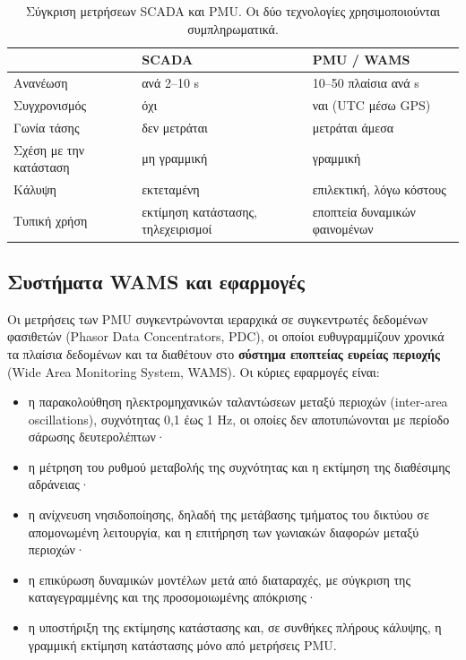 \begin{table}[!htbp]
\centering
\begin{tabular}{lll}
\hline
 & SCADA & PMU / WAMS \\
\hline
Ανανέωση         & ανά 2--10 s        & 10--50 πλαίσια ανά s \\
Συγχρονισμός     & όχι                & ναι (UTC μέσω GPS) \\
Γωνία τάσης      & δεν μετράται       & μετράται άμεσα \\
Σχέση με την κατάσταση & μη γραμμική & γραμμική \\
Κάλυψη           & εκτεταμένη         & επιλεκτική, λόγω κόστους \\
Τυπική χρήση     & εκτίμηση κατάστασης, τηλεχειρισμοί & εποπτεία δυναμικών φαινομένων \\
\hline
\end{tabular}
\caption{Σύγκριση μετρήσεων SCADA και PMU. Οι δύο τεχνολογίες χρησιμοποιούνται
συμπληρωματικά.}
\label{tab:scada-pmu}
\end{table}

\subsection{Συστήματα WAMS και εφαρμογές}

Οι μετρήσεις των PMU συγκεντρώνονται ιεραρχικά σε συγκεντρωτές δεδομένων φασιθετών (Phasor
Data Concentrators, PDC), οι οποίοι ευθυγραμμίζουν χρονικά τα πλαίσια δεδομένων και τα
διαθέτουν στο \textbf{σύστημα εποπτείας ευρείας περιοχής} (Wide Area Monitoring System,
WAMS). Οι κύριες εφαρμογές είναι:

\begin{itemize}
\item η παρακολούθηση ηλεκτρομηχανικών ταλαντώσεων μεταξύ περιοχών (inter-area
      oscillations), συχνότητας 0,1 έως 1 Hz, οι οποίες δεν αποτυπώνονται με περίοδο
      σάρωσης δευτερολέπτων·
\item η μέτρηση του ρυθμού μεταβολής της συχνότητας και η εκτίμηση της διαθέσιμης
      αδράνειας·
\item η ανίχνευση νησιδοποίησης, δηλαδή της μετάβασης τμήματος του δικτύου σε απομονωμένη
      λειτουργία, και η επιτήρηση των γωνιακών διαφορών μεταξύ περιοχών·
\item η επικύρωση δυναμικών μοντέλων μετά από διαταραχές, με σύγκριση της καταγεγραμμένης
      και της προσομοιωμένης απόκρισης·
\item η υποστήριξη της εκτίμησης κατάστασης και, σε συνθήκες πλήρους κάλυψης, η
      γραμμική εκτίμηση κατάστασης μόνο από μετρήσεις PMU.
\end{itemize}

